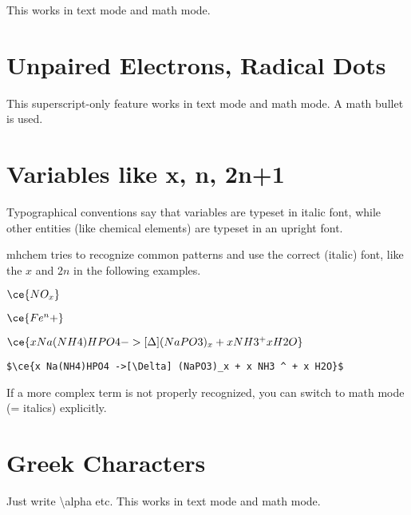 \documentclass[a4paper,notitlepage,parskip=half]{scrreprt}
\newcommand\macro[1]{{\ttfamily\textbackslash#1}}
\begin{document}
This works in text mode and math mode.


\section{Unpaired Electrons, Radical Dots}

\begin{SideBySideExample}[xrightmargin=3cm]
\end{SideBySideExample}

\begin{SideBySideExample}[xrightmargin=3cm]
\end{SideBySideExample}

This superscript-only feature works in text mode and math mode. A math bullet is used.


\section {Variables like x, n, 2n+1}

Typographical conventions say that variables are typeset in italic font, while other entities (like chemical elements) are typeset in an upright font.

mhchem tries to recognize common patterns and use the correct (italic) font, like the $x$ and $2n$ in the following examples.

\begin{SideBySideExample}[xrightmargin=4cm]
  $\ce{NO_x}$ \sffamily\bfseries {}
\end{SideBySideExample}

\begin{SideBySideExample}[xrightmargin=4cm]
  $\ce{Fe^n+}$ \sffamily\bfseries {}
\end{SideBySideExample}

$\ce{x Na(NH4)HPO4 ->[\Delta] (NaPO3)_x + x NH3 ^ + x H2O}$\par
{\raggedleft\verb|$\ce{x Na(NH4)HPO4 ->[\Delta] (NaPO3)_x + x NH3 ^ + x H2O}$|\par}

If a more complex term is not properly recognized, you can switch to math mode (= italics) explicitly.


\section{Greek Characters}

Just write \macro{alpha} etc. This works in text mode and math mode.
\end{document}
